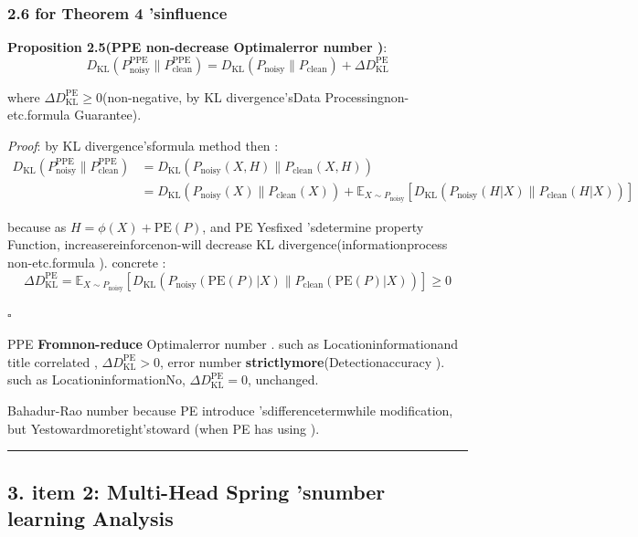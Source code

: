 \documentclass[
  12pt,
]{article}
\begin{document}
\subsubsection{2.6 for  Theorem 4
'sinfluence }\label{ux5bf9-theorem-4-ux7684ux5f71ux54cd}

\textbf{Proposition 2.5(PPE non-decrease Optimalerror number )}: 
\[\boxed{D_{\text{KL}}(P_{\text{noisy}}^{\text{PPE}} \| P_{\text{clean}}^{\text{PPE}}) = D_{\text{KL}}(P_{\text{noisy}} \| P_{\text{clean}}) + \Delta D_{\text{KL}}^{\text{PE}}}\]

where \(\Delta D_{\text{KL}}^{\text{PE}} \geq 0\)(non-negative, by  KL
divergence'sData Processingnon-etc.formula Guarantee). 

\emph{Proof}: by  KL divergence'sformula method then :  \begin{align*}
D_{\text{KL}}(P_{\text{noisy}}^{\text{PPE}} \| P_{\text{clean}}^{\text{PPE}})
&= D_{\text{KL}}(P_{\text{noisy}}(X, H) \| P_{\text{clean}}(X, H)) \\
&= D_{\text{KL}}(P_{\text{noisy}}(X) \| P_{\text{clean}}(X)) + \mathbb{E}_{X \sim P_{\text{noisy}}}[D_{\text{KL}}(P_{\text{noisy}}(H|X) \| P_{\text{clean}}(H|X))]
\end{align*}

because as  \(H = \phi(X) + \text{PE}(P)\), and  PE
Yesfixed 'sdetermine property Function, increasereinforcenon-will decrease  KL divergence(informationprocess non-etc.formula ). concrete : 
\[\Delta D_{\text{KL}}^{\text{PE}} = \mathbb{E}_{X \sim P_{\text{noisy}}}[D_{\text{KL}}(P_{\text{noisy}}(\text{PE}(P)|X) \| P_{\text{clean}}(\text{PE}(P)|X))] \geq 0\]

\(\square\)

PPE
\textbf{Fromnon-reduce }Optimalerror number . such as Locationinformationand title correlated , \(\Delta D_{\text{KL}}^{\text{PE}} > 0\), error number \textbf{strictlymore}(Detectionaccuracy ). such as LocationinformationNo, \(\Delta D_{\text{KL}}^{\text{PE}} = 0\), unchanged. 

Bahadur-Rao number because  PE introduce 'sdifferencetermwhile modification, but Yestowardmoretight'stoward (when  PE
has using ). 

\begin{center}\rule{0.5\linewidth}{0.5pt}\end{center}

\subsection{3. item  2: Multi-Head Spring
'snumber learning Analysis}\label{ux7ec4ux4ef6-2multi-head-spring-ux7684ux6570ux5b66ux5206ux6790}
\end{document}
